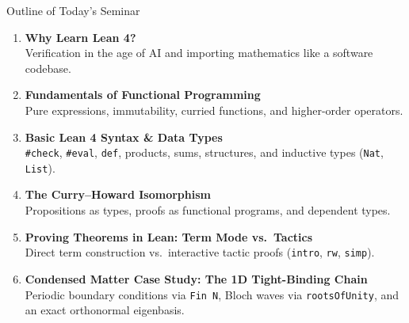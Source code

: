 \documentclass[aspectratio=169, 10pt]{beamer}
\begin{document}
\begin{frame}{Outline of Today's Seminar}
  \begin{enumerate}
    \setlength{\itemsep}{6pt}
    \item \textbf{Why Learn Lean 4?} \\
      {\small Verification in the age of AI and importing mathematics like a software codebase.}

    \item \textbf{Fundamentals of Functional Programming} \\
      {\small Pure expressions, immutability, curried functions, and higher-order operators.}

    \item \textbf{Basic Lean 4 Syntax \& Data Types} \\
      {\small \texttt{\#check}, \texttt{\#eval}, \texttt{def}, products, sums, structures, and inductive types (\texttt{Nat}, \texttt{List}).}

    \item \textbf{The Curry--Howard Isomorphism} \\
      {\small Propositions as types, proofs as functional programs, and dependent types.}

    \item \textbf{Proving Theorems in Lean: Term Mode vs.\ Tactics} \\
      {\small Direct term construction vs.\ interactive tactic proofs (\texttt{intro}, \texttt{rw}, \texttt{simp}).}

    \item \textbf{Condensed Matter Case Study: The 1D Tight-Binding Chain} \\
      {\small Periodic boundary conditions via \texttt{Fin N}, Bloch waves via \texttt{rootsOfUnity}, and an exact orthonormal eigenbasis.}
  \end{enumerate}
\end{frame}
\end{document}
